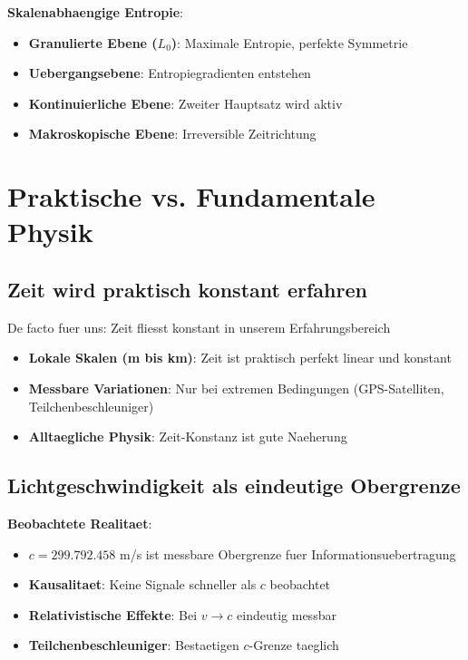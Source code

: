 \documentclass[12pt,a4paper]{article}
\newcommand{\Lzero}{L_0}
\theoremstyle{definition}
\theoremstyle{remark}
\begin{document}
	\textbf{Skalenabhaengige Entropie}:
	\begin{itemize}
		\item \textbf{Granulierte Ebene ($\Lzero$)}: Maximale Entropie, perfekte Symmetrie
		\item \textbf{Uebergangsebene}: Entropiegradienten entstehen
		\item \textbf{Kontinuierliche Ebene}: Zweiter Hauptsatz wird aktiv
		\item \textbf{Makroskopische Ebene}: Irreversible Zeitrichtung
	\end{itemize}
	
	\section{Praktische vs. Fundamentale Physik}
	
	\subsection{Zeit wird praktisch konstant erfahren}
	
	De facto fuer uns: Zeit fliesst konstant in unserem Erfahrungsbereich
	\begin{itemize}
		\item \textbf{Lokale Skalen (m bis km)}: Zeit ist praktisch perfekt linear und konstant
		\item \textbf{Messbare Variationen}: Nur bei extremen Bedingungen (GPS-Satelliten, Teilchenbeschleuniger)
		\item \textbf{Alltaegliche Physik}: Zeit-Konstanz ist gute Naeherung
	\end{itemize}
	
	\subsection{Lichtgeschwindigkeit als eindeutige Obergrenze}
	
	\textbf{Beobachtete Realitaet}:
	\begin{itemize}
		\item $c = 299.792.458$ m/s ist messbare Obergrenze fuer Informationsuebertragung
		\item \textbf{Kausalitaet}: Keine Signale schneller als $c$ beobachtet
		\item \textbf{Relativistische Effekte}: Bei $v \rightarrow c$ eindeutig messbar
		\item \textbf{Teilchenbeschleuniger}: Bestaetigen $c$-Grenze taeglich
	\end{itemize}
	
\end{document}
